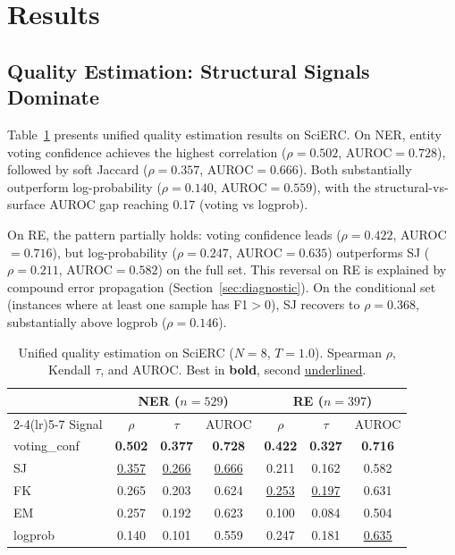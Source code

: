 \documentclass[11pt,a4paper]{article}
\begin{document}
\section{Results}
\label{sec:results}

\subsection{Quality Estimation: Structural Signals Dominate}
\label{sec:qe}

Table~\ref{tab:unified} presents unified quality estimation results on SciERC.
On NER, entity voting confidence achieves the highest correlation ($\rho{=}0.502$, AUROC${=}0.728$), followed by soft Jaccard ($\rho{=}0.357$, AUROC${=}0.666$).
Both substantially outperform log-probability ($\rho{=}0.140$, AUROC${=}0.559$), with the structural-vs-surface AUROC gap reaching 0.17 (voting vs logprob).

On RE, the pattern partially holds: voting confidence leads ($\rho{=}0.422$, AUROC${=}0.716$), but log-probability ($\rho{=}0.247$, AUROC${=}0.635$) outperforms SJ ($\rho{=}0.211$, AUROC${=}0.582$) on the full set.
This reversal on RE is explained by compound error propagation (Section~\ref{sec:diagnostic}).
On the conditional set (instances where at least one sample has F1$>$0), SJ recovers to $\rho{=}0.368$, substantially above logprob ($\rho{=}0.146$).

\begin{table}[t]
\centering
\small
\caption{Unified quality estimation on SciERC ($N{=}8$, $T{=}1.0$). Spearman $\rho$, Kendall $\tau$, and AUROC. Best in \textbf{bold}, second \underline{underlined}.}
\label{tab:unified}
\begin{tabular}{l ccc ccc}
\toprule
& \multicolumn{3}{c}{\textbf{NER} ($n{=}529$)} & \multicolumn{3}{c}{\textbf{RE} ($n{=}397$)} \\
\cmidrule(lr){2-4}\cmidrule(lr){5-7}
Signal & $\rho$ & $\tau$ & AUROC & $\rho$ & $\tau$ & AUROC \\
\midrule
voting\_conf & \textbf{0.502} & \textbf{0.377} & \textbf{0.728} & \textbf{0.422} & \textbf{0.327} & \textbf{0.716} \\
SJ           & \underline{0.357} & \underline{0.266} & \underline{0.666} & 0.211 & 0.162 & 0.582 \\
FK           & 0.265 & 0.203 & 0.624 & \underline{0.253} & \underline{0.197} & 0.631 \\
EM           & 0.257 & 0.192 & 0.623 & 0.100 & 0.084 & 0.504 \\
logprob      & 0.140 & 0.101 & 0.559 & 0.247 & 0.181 & \underline{0.635} \\
\bottomrule
\end{tabular}
\end{table}
\end{document}
